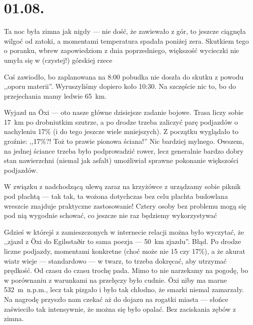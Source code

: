 \chapter*{01.08.}

Ta noc była zimna jak nigdy --- nie dość, że zawiewało z gór, to jeszcze ciągnęła wilgoć od zatoki, a momentami temperatura spadała poniżej zera. Skutkiem tego o poranku, wbrew zapowiedziom z dnia poprzedniego, większość wycieczki nie umyła się w (czystej!) górskiej rzece \wink


Coś zawiodło, bo zaplanowana na 8:00 pobudka nie doszła do skutku z powodu ,,oporu materii''. Wyruszyliśmy dopiero koło 10:30. Na szczęście nic to, bo do przejechania mamy ledwie 65~km.

Wyjazd na Öxi --- oto nasze główne dzisiejsze zadanie bojowe. Trasa liczy sobie 17~km po drobniutkim szutrze, a po drodze trzeba zaliczyć parę podjazdów o nachyleniu 17\% (i do tego jeszcze wiele mniejszych). Z początku wyglądało to groźnie: ,,17\%?! Toż to prawie pionowa ściana!'' Nic bardziej mylnego. Owszem, na jednej ściance trzeba było podprowadzić rower, lecz generalnie bardzo dobry stan nawierzchni (niemal jak asfalt) umożliwiał sprawne pokonanie większości podjazdów.


W związku z nadchodzącą ulewą zaraz na krzyżówce z  urządzamy sobie piknik pod płachtą --- tak tak, ta wożona dotychczas bez celu płachta budowlana wreszcie znajduje praktyczne zastosowanie! Cztery osoby bez problemu mogą się pod nią wygodnie schować, co jeszcze nie raz będziemy wykorzystywać\textellipsis

Gdzieś w którejś z zamieszczonych w internecie relacji można było wyczytać, że ,,zjazd z Öxi do Egilsstaðir to sama poezja --- 50~km zjazdu''. Błąd. Po drodze liczne podjazdy, momentami konkretne (choć może nie 15 czy 17\%), a że akurat wiatr wieje --- standardowo --- w twarz, to trzeba dokręcać, aby utrzymać prędkość. Od czasu do czasu trochę pada. Mimo to nie narzekamy na pogodę, bo w porównaniu z warunkami na przełęczy było cudnie. Öxi niby ma marne 532~m~n.p.m., lecz tak pizgało i było tak chłodno, że smarki niemal zamarzały. Na nagrodę przyszło nam czekać aż do dojazu na rogatki miasta --- słońce zaświeciło tak intensywnie, że można się było opalać. Bez zaciskania zębów z zimna.

